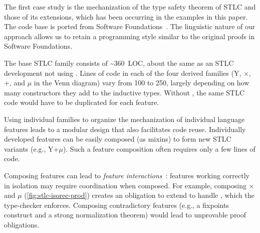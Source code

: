 



The first case study is the mechanization of the type safety theorem of
STLC and those of its extensions,
which has been occurring in the examples in this paper.
The code base is ported from Software Foundations~\cite{sf-pl}.
%
The linguistic nature of our approach allows us to retain a programming
style similar to the original proofs in Software Foundations.

The base STLC family consists of \textasciitilde360~LOC,
about the same as an STLC development not using \Lang.
%
Lines of code in each of the four derived families
($\mathrm{Y}$, $\times$, $+$, and $\mu$ in the Venn diagram)
vary from 100 to 250,
largely depending on how many constructors they add to the inductive types.
Without \Lang, the same STLC code would have to be duplicated for each feature.



Using individual families to organize the mechanization of individual
language features leads to a modular design that also facilitates code reuse.
%
Individually developed features can be easily composed (as mixins) to
form new STLC variants (e.g., $\mathrm{Y}$$+$$\mu$).
%
Such a feature composition often requires only a few lines of code.

Composing features can lead to \emph{feature interactions}~\cite{batory2011feature}:
features working correctly in isolation may require coordination when composed.
For example, composing $\times$ and $\mu$  %
(\cref{fig:stlc-isorec-prod}) creates an obligation to extend  to
handle , which the type-checker enforces.
%
Composing contradictory features (e.g., a fixpoints construct and a strong
normalization theorem) would lead to unprovable proof obligations.

